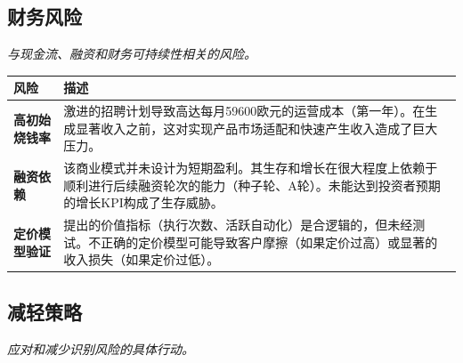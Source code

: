 \documentclass[11pt, a4paper, oneside]{article}
\begin{document}
\subsection{财务风险}
\textit{与现金流、融资和财务可持续性相关的风险。}

\begin{table}[H]
\centering
\begin{tabularx}{\textwidth}{@{}lL@{}}
\toprule
\textbf{风险} & \textbf{描述} \\
\midrule
\textbf{高初始烧钱率} & 激进的招聘计划导致高达每月59600欧元的运营成本（第一年）。在生成显著收入之前，这对实现产品市场适配和快速产生收入造成了巨大压力。 \\
\addlinespace
\textbf{融资依赖} & 该商业模式并未设计为短期盈利。其生存和增长在很大程度上依赖于顺利进行后续融资轮次的能力（种子轮、A轮）。未能达到投资者预期的增长KPI构成了生存威胁。 \\
\addlinespace
\textbf{定价模型验证} & 提出的价值指标（执行次数、活跃自动化）是合逻辑的，但未经测试。不正确的定价模型可能导致客户摩擦（如果定价过高）或显著的收入损失（如果定价过低）。 \\
\bottomrule
\end{tabularx}
\end{table}

\subsection{减轻策略}
\textit{应对和减少识别风险的具体行动。}
\end{document}
